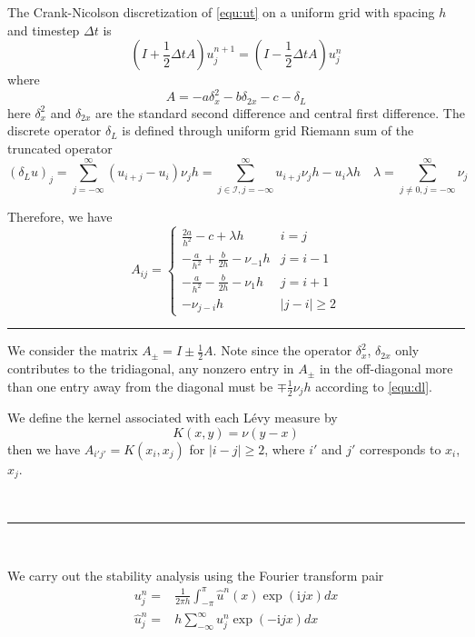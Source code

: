 \documentclass[10pt,a4paper]{article}
\newcommand{\ii}[0]{\mathrm{i}}
\theoremstyle{definition}
\begin{document}
The Crank-Nicolson discretization of \cref{equ:ut} on a uniform grid with spacing $h$ and timestep $\Delta t$ is 
\begin{equation}
	(I+\frac{1}{2}\Delta tA)u_j^{n+1} = (I-\frac{1}{2}\Delta tA)u_j^n
\end{equation}
where 
\begin{equation}
	A = -a\delta_x^2 - b\delta_{2x} - c - \delta_L
\end{equation}
here $\delta_x^2$ and $\delta_{2x}$ are the standard second difference and central first difference. The discrete operator $\delta_L$ is defined through uniform grid Riemann sum of the truncated operator
\begin{equation}\label{equ:dl}
	(\delta_L u)_j = \sum_{j=-\infty}^\infty (u_{i+j}-u_i)\nu_j h =  \sum_{j\in \mathcal{I}, j=-\infty}^\infty u_{i+j}\nu_j h - u_i \lambda h\quad \lambda = \sum_{j\neq 0, j=-\infty}^\infty \nu_j
\end{equation}

Therefore, we have
\begin{equation}
  {A_{ij}} = 
  \begin{cases}
  	{\frac{{2a}}{{{h^2}}} - c + \lambda h} & i=j\\
{ - \frac{a}{{{h^2}}} + \frac{b}{{2h}} - {\nu _{ - 1}h}} & j=i-1\\
{ - \frac{a}{{{h^2}}} - \frac{b}{{2h}} - {\nu _1}h} & j=i+1\\
{ - {\nu _{j - i}h}} & |j-i|\geq 2
  \end{cases}
\end{equation}
\hrule

We consider the matrix $A_\pm = I \pm \frac{1}{2}A$. Note since the operator $\delta_x^2$, $\delta_{2x}$ only contributes to the tridiagonal, any nonzero entry in $A_\pm$ in the off-diagonal more than one entry away from the diagonal must be $\mp\frac{1}{2}\nu_jh$ according to \cref{equ:dl}. 

We define the kernel associated with each L\'evy measure by
\begin{equation}
	K(x,y) = \nu(y-x)
\end{equation}
then we have $A_{i'j'}=K(x_{i},x_{j})$ for $|i-j|\geq 2$, where $i'$ and $j'$ corresponds to $x_{i}$, $x_j$.

\

\hrule

\

We carry out the stability analysis using the Fourier transform pair
\begin{align}
	u_j^n =& \frac{1}{2\pi h}\int_{-\pi}^\pi \hat u^n(x) \exp(\ii j x)dx\\
	\hat u_j^n =&  h \sum_{-\infty}^\infty u_j^n \exp(-\ii jx)dx
\end{align}
\end{document}
